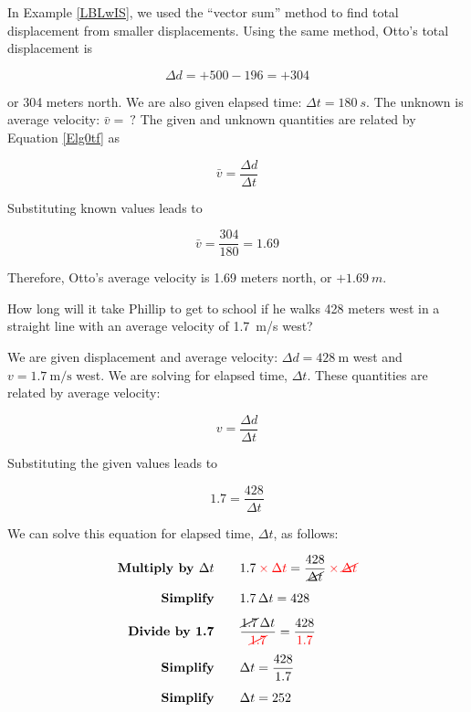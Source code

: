 \documentclass[main.tex]{subfiles}
\begin{document}
\Solution In Example \ref{LBLwIS}, we used the ``vector sum'' method to find total displacement from smaller displacements. Using the same method, Otto's total displacement is

\begin{equation*}
    \Delta{d} = +500 - 196 = +304
\end{equation*}

or 304 meters north. We are also given elapsed time: $\Delta{t} = \SI{180}{s}$. The unknown is average velocity: $\bar{v} =\ ?$ The given and unknown quantities are related by Equation \eqref{Elg0tf} as

\begin{equation*}
    \bar{v} = \frac{\Delta{d}}{\Delta{t}}
\end{equation*}

Substituting known values leads to 

\begin{equation*}
    \bar{v} = \frac{304}{180} = 1.69
\end{equation*}

Therefore, Otto's average velocity is 1.69 meters north, or $+\SI{1.69}{m}$.

\solutionEnd


\begin{example}
    How long will it take Phillip to get to school if he walks 428 meters west in a straight line with an average velocity of \SI{1.7}{m/s} west?
\end{example}

\Solution We are given displacement and average velocity: $\Delta{d} = \SI{428}{\meter}$ west and $v = \SI{1.7}{\meter/\second}$ west. We are solving for elapsed time, $\Delta t$. These quantities are related by average velocity:

\begin{equation*}
    v = \frac{\Delta d}{\Delta t}
\end{equation*}

Substituting the given values leads to

\begin{equation*}
    1.7 = \frac{428}{\Delta t}
\end{equation*}

We can solve this equation for elapsed time, $\Delta t$, as follows:

\begin{align*}
    \textbf{Multiply by $\Delta t$} \qquad & 1.7 \mathbin{\color{red} \times} \textcolor{red}{\Delta t} = \frac{428}{\cancel{\Delta t}} \mathbin{\color{red} \times} \textcolor{red}{\cancel{\Delta t}}\\[1ex]
    \textbf{Simplify} \qquad & 1.7\, \Delta t = 428\\[1ex]
    \textbf{Divide by 1.7} \qquad & \frac{\cancel{1.7}\, \Delta t}{\textcolor{red}{\cancel{1.7}}} = \frac{428}{\textcolor{red}{1.7}}\\[1ex]
    \textbf{Simplify} \qquad & \Delta{t} = \frac{428}{1.7}\\[1ex]
    \textbf{Simplify} \qquad & \Delta t = 252
\end{align*}
\end{document}
